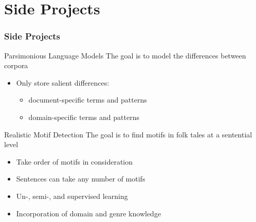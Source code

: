 \documentclass[11pt,t]{beamer}
\begin{document}
\section{Side Projects}
\begin{frame}
    \frametitle{Side Projects}

    \begin{block}{Parsimonious Language Models}
        The goal is to model the differences between corpora
        \begin{itemize}
            \item Only store salient differences:
                \begin{itemize}
                    \item document-specific terms and patterns
                    \item domain-specific terms and patterns
                \end{itemize}
        \end{itemize}
    \end{block}

    \begin{block}{Realistic Motif Detection}
        The goal is to find motifs in folk tales at a sentential level
        \begin{itemize}
            \item Take order of motifs in consideration
            \item Sentences can take any number of motifs
            \item Un-, semi-, and supervised learning
            \item Incorporation of domain and genre knowledge
        \end{itemize}
    \end{block}
\end{frame}
\end{document}
